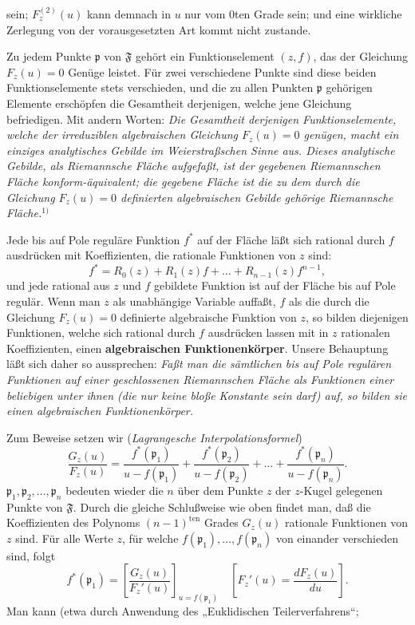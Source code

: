 \documentclass{article}
\begin{document}
sein; $F_z^{(2)}(u)$ kann demnach in $u$ nur vom 0ten Grade sein; und eine wirkliche Zerlegung von der vorausgesetzten Art kommt nicht zustande.

Zu jedem Punkte $\mathfrak{p}$ von $\mathfrak{F}$ gehört ein Funktionselement $(z, f)$, das der Gleichung $F_z(u) = 0$ Genüge leistet. Für zwei verschiedene Punkte sind diese beiden Funktionselemente stets verschieden, und die zu allen Punkten $\mathfrak{p}$ gehörigen Elemente erschöpfen die Gesamtheit derjenigen, welche jene Gleichung befriedigen. Mit andern Worten: \emph{Die Gesamtheit derjenigen Funktionselemente, welche der irreduziblen algebraischen Gleichung $F_z(u) = 0$ genügen, macht ein einziges analytisches Gebilde im Weierstraßschen Sinne aus. Dieses analytische Gebilde, als Riemannsche Fläche aufgefaßt, ist der gegebenen Riemannschen Fläche konform-äquivalent; die gegebene Fläche ist die zu dem durch die Gleichung $F_z(u) = 0$ definierten algebraischen Gebilde gehörige Riemannsche Fläche.}${}^{1)}$

Jede bis auf Pole reguläre Funktion $f^*$ auf der Fläche läßt sich rational durch $f$ ausdrücken mit Koeffizienten, die rationale Funktionen von $z$ sind:
\[ f^* = R_0(z) + R_1(z) f + \dots + R_{n-1}(z) f^{n-1}, \]
und jede rational aus $z$ und $f$ gebildete Funktion ist auf der Fläche bis auf Pole regulär. Wenn man $z$ als unabhängige Variable auffaßt, $f$ als die durch die Gleichung $F_z(u) = 0$ definierte algebraische Funktion von $z$, so bilden diejenigen Funktionen, welche sich rational durch $f$ ausdrücken lassen mit in $z$ rationalen Koeffizienten, einen \textbf{algebraischen Funktionenkörper}. Unsere Behauptung läßt sich daher so aussprechen: \emph{Faßt man die sämtlichen bis auf Pole regulären Funktionen auf einer geschlossenen Riemannschen Fläche als Funktionen einer beliebigen unter ihnen (die nur keine bloße Konstante sein darf) auf, so bilden sie einen algebraischen Funktionenkörper.}

Zum Beweise setzen wir (\emph{Lagrangesche Interpolationsformel})
\[ \frac{G_z(u)}{F_z(u)} = \frac{f^*(\mathfrak{p}_1)}{u - f(\mathfrak{p}_1)} + \frac{f^*(\mathfrak{p}_2)}{u - f(\mathfrak{p}_2)} + \dots + \frac{f^*(\mathfrak{p}_n)}{u - f(\mathfrak{p}_n)}. \]
$\mathfrak{p}_1, \mathfrak{p}_2, \dots, \mathfrak{p}_n$ bedeuten wieder die $n$ über dem Punkte $z$ der $z$-Kugel gelegenen Punkte von $\mathfrak{F}$. Durch die gleiche Schlußweise wie oben findet man, daß die Koeffizienten des Polynoms $(n - 1)^{\text{ten}}$ Grades $G_z(u)$ rationale Funktionen von $z$ sind. Für alle Werte $z$, für welche $f(\mathfrak{p}_1), \dots, f(\mathfrak{p}_n)$ von einander verschieden sind, folgt
\[ f^*(\mathfrak{p}_1) = \left[ \frac{G_z(u)}{F_z'(u)} \right]_{u = f(\mathfrak{p}_1)} \quad \left[ F_z'(u) = \frac{dF_z(u)}{du} \right]. \]
Man kann (etwa durch Anwendung des „Euklidischen Teilerverfahrens“;
\end{document}
